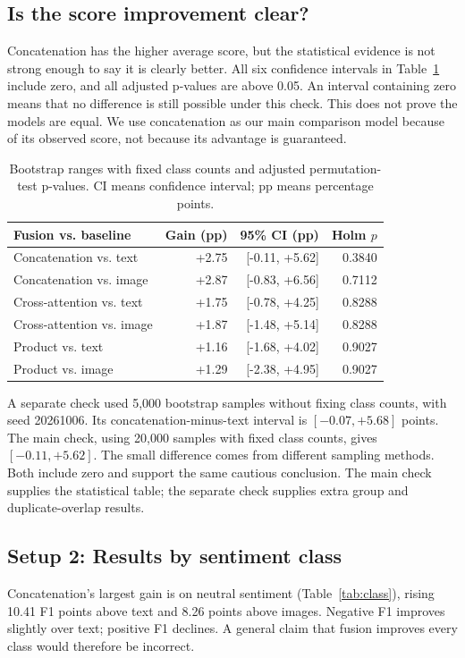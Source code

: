 \documentclass[11pt,a4paper]{article}
\begin{document}
\subsection{Is the score improvement clear?}
Concatenation has the higher average score, but the statistical evidence is not strong enough to say it is clearly better. All six confidence intervals in Table~\ref{tab:paired} include zero, and all adjusted p-values are above 0.05. An interval containing zero means that no difference is still possible under this check. This does not prove the models are equal. We use concatenation as our main comparison model because of its observed score, not because its advantage is guaranteed.

\begin{table}[htbp]
\centering\small
\begin{tabular}{lrrr}
\toprule
Fusion vs. baseline & Gain (pp) & 95\% CI (pp) & Holm $p$ \\
\midrule
Concatenation vs. text & +2.75 & [-0.11, +5.62] & 0.3840 \\
Concatenation vs. image & +2.87 & [-0.83, +6.56] & 0.7112 \\
Cross-attention vs. text & +1.75 & [-0.78, +4.25] & 0.8288 \\
Cross-attention vs. image & +1.87 & [-1.48, +5.14] & 0.8288 \\
Product vs. text & +1.16 & [-1.68, +4.02] & 0.9027 \\
Product vs. image & +1.29 & [-2.38, +4.95] & 0.9027 \\
\bottomrule
\end{tabular}
\caption{Bootstrap ranges with fixed class counts and adjusted permutation-test p-values. CI means confidence interval; pp means percentage points.}
\label{tab:paired}
\end{table}

A separate check used 5,000 bootstrap samples without fixing class counts, with seed 20261006. Its concatenation-minus-text interval is $[-0.07,+5.68]$ points. The main check, using 20,000 samples with fixed class counts, gives $[-0.11,+5.62]$. The small difference comes from different sampling methods. Both include zero and support the same cautious conclusion. The main check supplies the statistical table; the separate check supplies extra group and duplicate-overlap results.

\subsection{Setup 2: Results by sentiment class}
Concatenation's largest gain is on neutral sentiment (Table~\ref{tab:class}), rising 10.41 F1 points above text and 8.26 points above images. Negative F1 improves slightly over text; positive F1 declines. A general claim that fusion improves every class would therefore be incorrect.
\end{document}
